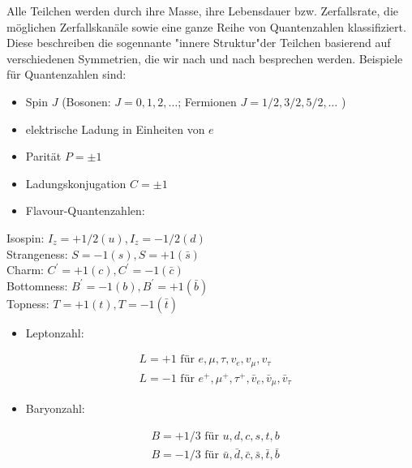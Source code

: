 \documentclass[10pt, letterpaper]{article}
\begin{document}
Alle Teilchen werden durch ihre Masse, ihre Lebensdauer bzw. Zerfallsrate, die möglichen Zerfallskanäle sowie eine ganze Reihe von Quantenzahlen klassifiziert. Diese beschreiben die sogennante "innere Struktur"der Teilchen basierend auf verschiedenen Symmetrien, die wir nach und nach besprechen werden. Beispiele für Quantenzahlen sind:

\begin{itemize}
  \item Spin $J$ (Bosonen: $J=0,1,2, \ldots$; Fermionen $J=1 / 2,3 / 2,5 / 2, \ldots$ )
  \item elektrische Ladung in Einheiten von $e$
  \item Parität $P= \pm 1$
  \item Ladungskonjugation $C= \pm 1$
  \item Flavour-Quantenzahlen:
\end{itemize}

Isospin: $I_{z}=+1 / 2(u), I_{z}=-1 / 2(d)$\\
Strangeness: $S=-1(s), S=+1(\bar{s})$\\
Charm: $C^{\prime}=+1(c), C^{\prime}=-1(\bar{c})$\\
Bottomness: $B^{\prime}=-1(b), B^{\prime}=+1(\bar{b})$\\
Topness: $T=+1(t), T=-1(\bar{t})$

\begin{itemize}
  \item Leptonzahl:
\end{itemize}

$$
\begin{aligned}
& L=+1 \text { für } e, \mu, \tau, v_{e}, v_{\mu}, v_{\tau} \\
& L=-1 \text { für } e^{+}, \mu^{+}, \tau^{+}, \bar{v}_{e}, \bar{v}_{\mu}, \bar{v}_{\tau}
\end{aligned}
$$

\begin{itemize}
  \item Baryonzahl:
\end{itemize}

$$
\begin{aligned}
& B=+1 / 3 \text { für } u, d, c, s, t, b \\
& B=-1 / 3 \text { für } \bar{u}, \bar{d}, \bar{c}, \bar{s}, \bar{t}, \bar{b}
\end{aligned}
$$
\end{document}

